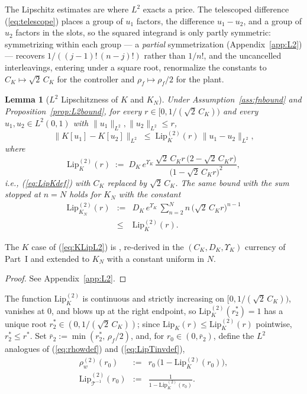 \documentclass[amsthm]{autart}
\theoremstyle{plain}
\newtheorem{lemma}{Lemma}
\theoremstyle{definition}
\newcommand{\Tcal}{\mathcal{T}}
\newcommand{\Ltwo}{L^2}
\newcommand{\Lipk}{\mathrm{Lip}_K}
\newcommand{\LipKn}{\mathrm{Lip}_{K_N}}
\newcommand{\LipT}{\mathrm{Lip}_{\Tcal^{-1}}}
\begin{document}
The Lipschitz estimates are where $\Ltwo$ exacts a price. The telescoped difference (\ref{eq:telescope}) places a group of $u_1$ factors, the difference $u_1 - u_2$, and a group of $u_2$ factors in the slots, so the squared integrand is only partly symmetric: symmetrizing within each group --- a \emph{partial} symmetrization (Appendix~\ref{app:L2}) --- recovers $1/((j-1)!\,(n-j)!)$ rather than $1/n!$, and the uncancelled interleavings, entering under a square root, renormalize the constants to $C_K \mapsto \sqrt{2}\,C_K$ for the controller and $\rho_f \mapsto \rho_f/2$ for the plant.

\begin{lemma}[$\Ltwo$ Lipschitzness of $K$ and $K_N$]\label{lem:KLipL2}
Under Assumption~\ref{ass:fnbound} and Proposition~\ref{prop:L2bound}, for every $r \in [0, 1/(\sqrt{2}\,C_K))$ and every $u_1, u_2 \in \Ltwo(0,1)$ with $\|u_1\|_{\Ltwo}, \|u_2\|_{\Ltwo} \le r$,
\begin{equation}
\bigl\|K[u_1] - K[u_2]\bigr\|_{\Ltwo} \;\le\; \Lipk^{(2)}(r)\,\|u_1 - u_2\|_{\Ltwo},
\label{eq:KLipL2}
\end{equation}
where
\begin{equation}
\Lipk^{(2)}(r) \;:=\; D_K\, e^{\Upsilon_K}\, \frac{\sqrt{2}\,C_K r\,\bigl(2 - \sqrt{2}\,C_K r\bigr)}{\bigl(1 - \sqrt{2}\,C_K r\bigr)^2},
\label{eq:LipK2def}
\end{equation}
i.e., (\ref{eq:LipKdef}) with $C_K$ replaced by $\sqrt{2}\,C_K$. The same bound with the sum stopped at $n = N$ holds for $K_N$ with the constant
\begin{eqnarray}
\LipKn^{(2)}(r) &:=& D_K\, e^{\Upsilon_K}\, \sum_{n=2}^N n\,\bigl(\sqrt{2}\,C_K r\bigr)^{n-1} \nonumber \\
&\le& \Lipk^{(2)}(r).
\label{eq:LipKN2def}
\end{eqnarray}
\end{lemma}

The $K$ case of (\ref{eq:KLipL2}) is \cite[Lemma~2]{krstic2026feedbacklinearizationhyperbolicpdes}, re-derived in the $(C_K, D_K, \Upsilon_K)$ currency of Part~I and extended to $K_N$ with a constant uniform in $N$.

\begin{proof} See Appendix~\ref{app:L2}. \end{proof}

The function $\Lipk^{(2)}$ is continuous and strictly increasing on $[0, 1/(\sqrt{2}\,C_K))$, vanishes at $0$, and blows up at the right endpoint, so $\Lipk^{(2)}(r_2^*) = 1$ has a unique root $r_2^* \in (0, 1/(\sqrt{2}\,C_K))$; since $\Lipk(r) \le \Lipk^{(2)}(r)$ pointwise, $r_2^* \le r^*$. Set $\bar r_2 := \min(r_2^*,\, \rho_f/2)$, and, for $r_0 \in (0, \bar r_2)$, define the $\Ltwo$ analogues of (\ref{eq:rhowdef}) and (\ref{eq:LipTinvdef}),
\begin{eqnarray}
\rho_w^{(2)}(r_0) &:=& r_0\,\bigl(1 - \Lipk^{(2)}(r_0)\bigr), \label{eq:rhow2def}\\
\LipT^{(2)}(r_0) &:=& \frac{1}{1 - \Lipk^{(2)}(r_0)}. \label{eq:LipT2def}
\end{eqnarray}
\end{document}
